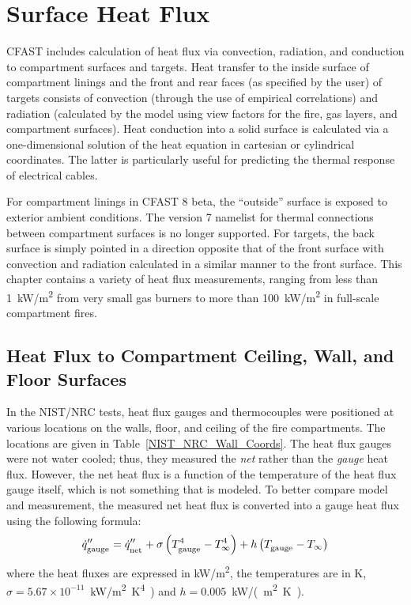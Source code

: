 
\chapter{Surface Heat Flux}

CFAST includes calculation of heat flux via convection, radiation, and conduction to compartment surfaces and targets. Heat transfer to the inside surface of compartment linings and the front and rear faces (as specified by the user) of targets consists of convection (through the use of empirical correlations) and radiation (calculated by the model using view factors for the fire, gas layers, and compartment surfaces). Heat conduction into a solid surface is calculated via a one-dimensional solution of the heat equation in cartesian or cylindrical coordinates.  The latter is particularly useful for predicting the thermal response of electrical cables.

For compartment linings in CFAST 8 beta, the ``outside'' surface is exposed to exterior ambient conditions. The version 7  namelist for thermal connections between compartment surfaces is no longer supported.  For targets, the back surface is simply pointed in a direction opposite that of the front surface with convection and radiation calculated in a similar manner to the front surface. This chapter contains a variety of heat flux measurements, ranging from less than 1~\unit{kW/m^2} from very small gas burners  to more than 100~\unit{kW/m^2} in full-scale compartment fires.

\section{Heat Flux to  Compartment Ceiling, Wall, and Floor Surfaces}
\label{Surface Heat Flux}
\label{Wall Heat Flux}
\label{Ceiling Heat Flux}
\label{Floor Heat Flux}

In the NIST/NRC tests, heat flux gauges and thermocouples were positioned at various locations on the walls, floor, and ceiling of the fire compartments. The locations are given in Table~\ref{NIST_NRC_Wall_Coords}. The heat flux gauges were not water cooled; thus, they measured the {\em net} rather than the {\em gauge} heat flux. However, the net heat flux is a function of the temperature of the heat flux gauge itself, which is not something that is modeled. To better compare model and measurement, the measured net heat flux is converted into a gauge heat flux using the following formula:
\begin{equation}
\dot{q}''_{\sb{\textnormal{\scriptsize \hbox{gauge}}}} = \dot{q}''_{\sb{\textnormal{\scriptsize \hbox{net}}}} + \sigma \left( T^4_{\sb{\textnormal{\scriptsize \hbox{gauge}}}} - T^4_\infty \right) + h  \left( T_{\sb{\textnormal{\scriptsize \hbox{gauge}}}}-T_\infty \right)
\end{equation}
where the heat fluxes are expressed in \unit{kW/m^2}, the temperatures are in K, $\sigma=5.67 \times 10^{-11}$~\unit{kW/m^2.K^4)} and $h=0.005$~\unit{kW/(m^2.K)}.

